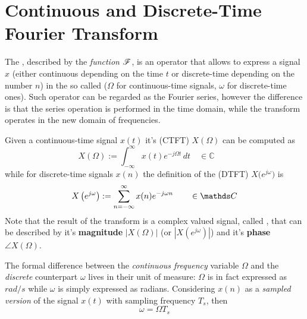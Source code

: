\chapter{Continuous and Discrete-Time Fourier Transform} \label{sec:fourietransforms}
	
	The , described by the \textit{function} $\mathscr F$, is an operator that allows to express a signal $x$ (either continuous depending on the time $t$ or discrete-time depending on the number $n$) in the so called  ($\Omega$ for continuous-time signals, $\omega$ for discrete-time ones). Such operator can be regarded as the Fourier series, however the difference is that the series operation is performed in the time domain, while the transform operates in the new domain of frequencies.
	
	Given a continuous-time signal $x(t)$ it's \textbf{\ctft} (CTFT) $X(\Omega)$ can be computed as
	\begin{equation} \label{eq:four:ctft}
		X(\Omega) := \int_{-\infty}^{\infty} x(t) e^{-j\Omega t} \, dt \quad \in \mathds C \qquad 
	\end{equation}
	while for discrete-time signals $x(n)$ the definition of the \textbf{\dtft} (DTFT) $X\big(e^{j\omega}\big)$ is
	\begin{equation} \label{eq:four:dtft}
		X\left(e^{j\omega}\right) := \infsum n x(n) e^{-j\omega n} \qquad \in \mathds C
	\end{equation}
	Note that the result of the transform is a complex valued signal, called , that can be described by it's \textbf{magnitude} $|X(\Omega)|$ (or $|X(e^{j\omega})|$) and it's \textbf{phase} $\angle X(\Omega)$.
	
	The formal difference between the \textit{continuous frequency} variable $\Omega$ and the \textit{discrete} counterpart $\omega$ lives in their unit of measure: $\Omega$ is in fact expressed as $rad/s$ while $\omega$ is simply expressed as radians. Considering $x(n)$ as a \textit{sampled version} of the signal $x(t)$ with sampling frequency $T_s$, then
	\[ \omega  = \Omega T_s \]
	
